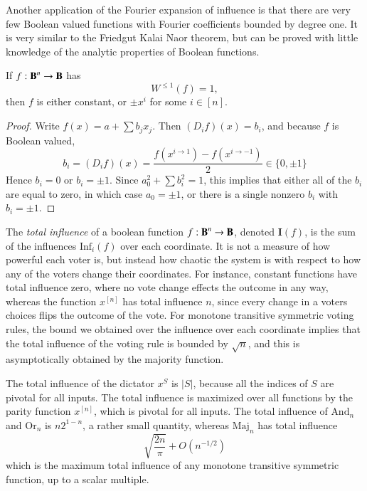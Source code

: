 Another application of the Fourier expansion of influence is that there are very few Boolean valued functions with Fourier coefficients bounded by degree one. It is very similar to the Friedgut Kalai Naor theorem, but can be proved with little knowledge of the analytic properties of Boolean functions.

\begin{lemma}
    If $f: \operatorname{\mathbf{B}}^n \to \operatorname{\mathbf{B}}$ has
    \[ W^{\leq 1}(f) = 1, \]
    then $f$ is either constant, or $\pm x^i$ for some $i \in [n]$.
\end{lemma}
\begin{proof}
    Write $f(x) = a + \sum b_j x_j$. Then $(D_i f)(x) = b_i$, and because $f$ is Boolean valued,
    \[ b_i = (D_i f)(x) = \frac{f(x^{i \to 1}) - f(x^{i \to -1})}{2} \in \{ 0, \pm 1 \} \]
    Hence $b_i = 0$ or $b_i = \pm 1$. Since $a_0^2 + \sum b_i^2 = 1$, this implies that either all of the $b_i$ are equal to zero, in which case $a_0 = \pm 1$, or there is a single nonzero $b_i$ with $b_i = \pm 1$.
\end{proof}

The \emph{total influence} of a boolean function $f: \operatorname{\mathbf{B}}^n \to \operatorname{\mathbf{B}}$, denoted $\mathbf{I}(f)$, is the sum of the influences $\text{Inf}_i(f)$ over each coordinate. It is not a measure of how powerful each voter is, but instead how chaotic the system is with respect to how any of the voters change their coordinates. For instance, constant functions have total influence zero, where no vote change effects the outcome in any way, whereas the function $x^{[n]}$ has total influence $n$, since every change in a voters choices flips the outcome of the vote. For monotone transitive symmetric voting rules, the bound we obtained over the influence over each coordinate implies that the total influence of the voting rule is bounded by $\sqrt{n}$, and this is asymptotically obtained by the majority function.

\begin{example}
    The total influence of the dictator $x^S$ is $|S|$, because all the indices of $S$ are pivotal for all inputs. The total influence is maximized over all functions by the parity function $x^{[n]}$, which is pivotal for all inputs. The total influence of $\text{And}_n$ and $\text{Or}_n$ is $n2^{1-n}$, a rather small quantity, whereas $\text{Maj}_n$ has total influence
    \[ \sqrt{\frac{2n}{\pi}} + O \left( n^{-1/2} \right) \]
    which is the maximum total influence of any monotone transitive symmetric function, up to a scalar multiple.
\end{example}

